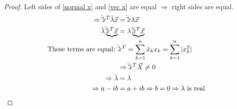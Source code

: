 \documentclass[12pt]{amsart}
\numberwithin{equation}{theorem}    %
\DeclarePairedDelimiter\abs{\lvert}{\rvert}  %
\begin{document}
\begin{proof}
    Left sides of \eqref{normal x} and \eqref{vec x} are equal $\Rightarrow$ right sides are equal.
    \begin{align*}
        \Rightarrow \bar\vec{x}^T \bar\lambda \vec{x} &= \bar\vec{x}\lambda\vec{x} \\
        \bar\lambda\underbrace{\bar\vec{x}^T\vec{x}} &= \lambda\underbrace{\bar\vec{x}^T\vec{x}} \\
        \text{These terms are equal: } & \bar\vec{x}^T = \sum_{k=1}^{n}{\bar x_k x_k} = \sum_{k=1}^{n}{\abs{x_{k}^{2}}} \\
        & \Rightarrow \bar\vec{x}^T\vec{X} \neq 0 \\
        \Rightarrow \bar\lambda &= \lambda \\
        \Rightarrow a-ib &= a+ib \Rightarrow b=0 \Rightarrow \lambda \text{ is real} 
    \end{align*}
\end{proof}
\end{document}
